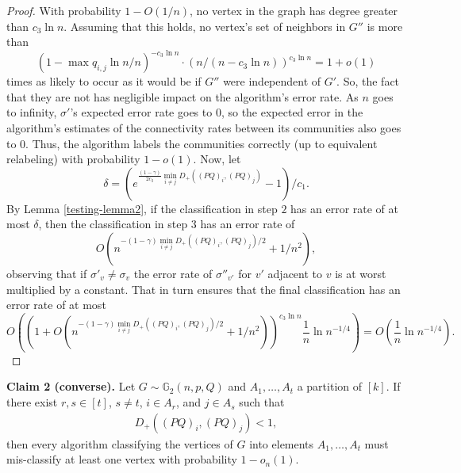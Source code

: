 \documentclass[11pt]{article}
\newcommand{\gs}{\mathbb{G}_2}
\newcommand{\dd}{D_+}
\newcommand{\1}{\mathbb{1}}
\begin{document}
\begin{proof}
With probability $1-O(1/n)$, no vertex in the graph has degree greater than $c_3\ln n$. Assuming that this holds, no vertex's set of neighbors in $G''$ is more than $$(1-\max q_{i,j} \ln n/n)^{-c_3\ln n}\cdot (n/(n-c_3\ln n))^{c_3\ln n}=1+o(1)$$ times as likely to occur as it would be if $G''$ were independent of $G'$. So, the fact that they are not has negligible impact on the algorithm's error rate. As $n$ goes to infinity, $\sigma'$'s expected error rate goes to $0$, so the expected error in the algorithm's estimates of the connectivity rates between its communities also goes to $0$. Thus, the algorithm labels the communities correctly (up to equivalent relabeling) with probability $1-o(1)$. Now, let $$\delta=(e^{\frac{(1-\gamma)}{2c_3} \min_{i\ne j} \dd((PQ)_i,(PQ)_j)}-1)/c_1.$$ By Lemma \ref{testing-lemma2}, if the classification in step $2$ has an error rate of at most $\delta$, then the classification in step $3$ has an error rate of $$O(n^{- (1-\gamma)\min_{i\ne j} \dd((PQ)_i,(PQ)_j)/2}+1/n^2),$$ observing that if $\sigma'_v\ne \sigma_v$ the error rate of $\sigma''_{v'}$ for $v'$ adjacent to $v$ is at worst multiplied by a constant. That in turn ensures that the final classification has an error rate of at most \[O\left((1+O(n^{- (1-\gamma)\min_{i\ne j} \dd((PQ)_i,(PQ)_j)/2}+1/n^2))^{c_3\ln n} \frac{1}{n}\ln{n}^{-1/4}\right)=O\left(\frac{1}{n}\ln n^{-1/4}\right) .\]
\end{proof}

\noindent
{\bf Claim 2 (converse).} Let $G \sim \gs(n,p,Q)$ and $A_1,\dots,A_t$ a partition of $[k]$. If there exist $r,s \in [t]$, $s\neq t$, $i \in A_r$, and $j \in A_s$ such that 
\begin{align}
\dd ((PQ)_i , (PQ)_j) < 1, 
\end{align}
then every algorithm classifying the vertices of $G$ into elements $A_1,\dots,A_t$ must mis-classify at least one vertex with probability $1-o_n(1)$.
\end{document}
